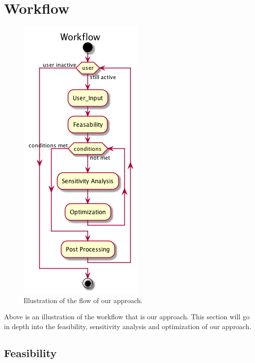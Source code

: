 \documentclass[10pt]{article}
\begin{document}
\section{Workflow}
 		\begin{figure}[h!]
		 \begin{center}\includegraphics[scale=.4]{IMSM_Workflow.png}\end{center}
		 \caption{Illustration of the flow of our approach.}
		 \label{Workflow}
		 
		 \end{figure}
Above is an illustration of the workflow that is our approach. This section will go in depth into the feasibility, sensitivity analysis and optimization of our approach.

\subsection{Feasibility}
\end{document}

